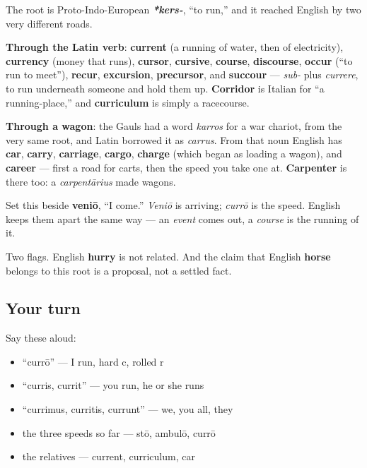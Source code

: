 \begin{cousinweb}
The root is Proto-Indo-European \emph{\textbf{*kers-}}, \textquotedblleft{}to run,\textquotedblright{} and it reached English by two very different roads.

\textbf{Through the Latin verb}: \textbf{current} (a running of water, then of electricity), \textbf{currency} (money that runs), \textbf{cursor}, \textbf{cursive}, \textbf{course}, \textbf{discourse}, \textbf{occur} (\textquotedblleft{}to run to meet\textquotedblright{}), \textbf{recur}, \textbf{excursion}, \textbf{precursor}, and \textbf{succour} — \emph{sub-} plus \emph{currere}, to run underneath someone and hold them up. \textbf{Corridor} is Italian for \textquotedblleft{}a running-place,\textquotedblright{} and \textbf{curriculum} is simply a racecourse.

\textbf{Through a wagon}: the Gauls had a word \emph{karros} for a war chariot, from the very same root, and Latin borrowed it as \emph{carrus}. From that noun English has \textbf{car}, \textbf{carry}, \textbf{carriage}, \textbf{cargo}, \textbf{charge} (which began as loading a wagon), and \textbf{career} — first a road for carts, then the speed you take one at. \textbf{Carpenter} is there too: a \emph{carpentārius} made wagons.

Set this beside \textbf{veniō}, \textquotedblleft{}I come.\textquotedblright{} \emph{Veniō} is arriving; \emph{currō} is the speed. English keeps them apart the same way — an \emph{event} comes out, a \emph{course} is the running of it.

Two flags. English \textbf{hurry} is not related. And the claim that English \textbf{horse} belongs to this root is a proposal, not a settled fact.
\end{cousinweb}

\subsection*{Your turn}
Say these aloud:

\begin{itemize}
\raggedright
  \item \textquotedblleft{}currō\textquotedblright{} — I run, hard c, rolled r
  \item \textquotedblleft{}curris, currit\textquotedblright{} — you run, he or she runs
  \item \textquotedblleft{}currimus, curritis, currunt\textquotedblright{} — we, you all, they
  \item the three speeds so far — stō, ambulō, currō
  \item the relatives — current, curriculum, car
\end{itemize}

